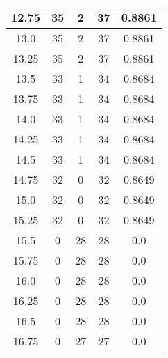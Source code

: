 \documentclass[letterpaper, 12pt]{article}
\begin{document}
\begin{longtable}{|c|c|c|c|c|}
\hline
12.75 & 35 & 2 & 37 & 0.8861 \\
\hline
13.0 & 35 & 2 & 37 & 0.8861 \\
\hline
13.25 & 35 & 2 & 37 & 0.8861 \\
\hline
13.5 & 33 & 1 & 34 & 0.8684 \\
\hline
13.75 & 33 & 1 & 34 & 0.8684 \\
\hline
14.0 & 33 & 1 & 34 & 0.8684 \\
\hline
14.25 & 33 & 1 & 34 & 0.8684 \\
\hline
14.5 & 33 & 1 & 34 & 0.8684 \\
\hline
14.75 & 32 & 0 & 32 & 0.8649 \\
\hline
15.0 & 32 & 0 & 32 & 0.8649 \\
\hline
15.25 & 32 & 0 & 32 & 0.8649 \\
\hline
15.5 & 0 & 28 & 28 & 0.0 \\
\hline
15.75 & 0 & 28 & 28 & 0.0 \\
\hline
16.0 & 0 & 28 & 28 & 0.0 \\
\hline
16.25 & 0 & 28 & 28 & 0.0 \\
\hline
16.5 & 0 & 28 & 28 & 0.0 \\
\hline
16.75 & 0 & 27 & 27 & 0.0 \\
\hline
\end{longtable}
\end{document}
